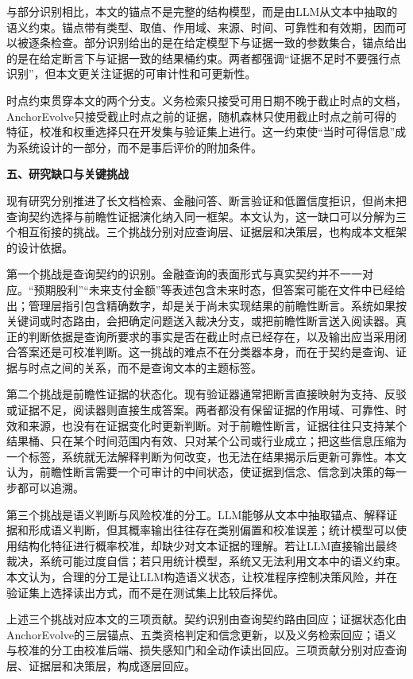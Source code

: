 与部分识别相比，本文的锚点不是完整的结构模型，而是由LLM从文本中抽取的语义约束。锚点带有类型、取值、作用域、来源、时间、可靠性和有效期，因而可以被逐条检查。部分识别给出的是在给定模型下与证据一致的参数集合，锚点给出的是在给定断言下与证据一致的结果桶约束。两者都强调“证据不足时不要强行点识别”，但本文更关注证据的可审计性和可更新性。

时点约束贯穿本文的两个分支。义务检索只接受可用日期不晚于截止时点的文档，AnchorEvolve只接受截止时点之前的证据，随机森林只使用截止时点之前可得的特征，校准和权重选择只在开发集与验证集上进行。这一约束使“当时可得信息”成为系统设计的一部分，而不是事后评价的附加条件。

\noindent\textbf{五、研究缺口与关键挑战}

现有研究分别推进了长文档检索、金融问答、断言验证和低置信度拒识，但尚未把查询契约选择与前瞻性证据演化纳入同一框架。本文认为，这一缺口可以分解为三个相互衔接的挑战。三个挑战分别对应查询层、证据层和决策层，也构成本文框架的设计依据。

第一个挑战是查询契约的识别。金融查询的表面形式与真实契约并不一一对应。“预期股利”“未来支付金额”等表述包含未来时态，但答案可能在文件中已经给出；管理层指引包含精确数字，却是关于尚未实现结果的前瞻性断言。系统如果按关键词或时态路由，会把确定问题送入裁决分支，或把前瞻性断言送入阅读器。真正的判断依据是查询所要求的事实是否在截止时点已经存在，以及输出应当采用闭合答案还是可校准判断。这一挑战的难点不在分类器本身，而在于契约是查询、证据与时点之间的关系，而不是查询文本的主题标签。

第二个挑战是前瞻性证据的状态化。现有验证器通常把断言直接映射为支持、反驳或证据不足，阅读器则直接生成答案。两者都没有保留证据的作用域、可靠性、时效和来源，也没有在证据变化时更新判断。对于前瞻性断言，证据往往只支持某个结果桶、只在某个时间范围内有效、只对某个公司或行业成立；把这些信息压缩为一个标签，系统就无法解释判断为何改变，也无法在结果揭示后更新可靠性。本文认为，前瞻性断言需要一个可审计的中间状态，使证据到信念、信念到决策的每一步都可以追溯。

第三个挑战是语义判断与风险校准的分工。LLM能够从文本中抽取锚点、解释证据和形成语义判断，但其概率输出往往存在类别偏置和校准误差；统计模型可以使用结构化特征进行概率校准，却缺少对文本证据的理解。若让LLM直接输出最终裁决，系统可能过度自信；若只用统计模型，系统又无法利用文本中的语义约束。本文认为，合理的分工是让LLM构造语义状态，让校准程序控制决策风险，并在验证集上选择读出方式，而不是在测试集上比较后择优。

上述三个挑战对应本文的三项贡献。契约识别由查询契约路由回应；证据状态化由AnchorEvolve的三层锚点、五类资格判定和信念更新，以及义务检索回应；语义与校准的分工由校准后端、损失感知门和全动作读出回应。三项贡献分别对应查询层、证据层和决策层，构成逐层回应。

